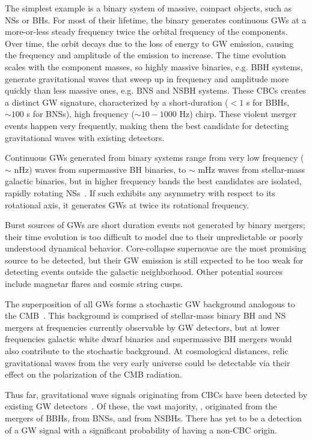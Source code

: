 The simplest example is a binary system of massive, compact objects, such as \acp{NS} or \acp{BH}.
For most of their lifetime, the binary generates continuous \acp{GW} at a more-or-less steady frequency twice the orbital frequency of the components.
Over time, the orbit decays due to the loss of energy to \ac{GW} emission, causing the frequency and amplitude of the emission to increase.
The time evolution scales with the component masses, so highly massive binaries, e.g. \ac{BBH} systems, generate gravitational waves that sweep up in frequency and amplitude more quickly than less massive ones, e.g. \ac{BNS} and \ac{NSBH}  systems.
These \acp{CBC} creates a distinct \ac{GW} signature, characterized by a short-duration ($<1$ s for \acp{BBH}, $\sim100$ s for \acp{BNS}), high frequency ($\sim10-1000$ Hz) chirp.
These violent merger events happen very frequently, making them the best candidate for detecting gravitational waves with existing detectors.

Continuous \acp{GW} generated from binary systems range from very low frequency ($\sim$ nHz) waves from supermassive \ac{BH} binaries, to $\sim$ mHz waves from stellar-mass galactic binaries, but in higher frequency bands the best candidates are isolated, rapidly rotating \acp{NS}~\citep{Riles_2017}.
If such  exhibits any asymmetry with respect to its rotational axis, it generates \acp{GW} at twice its rotational frequency.

Burst sources of \acp{GW} are short duration events not generated by binary mergers; their time evolution is too difficult to model due to their unpredictable or poorly understood dynamical behavior.
Core-collapse supernovae are the most promising source to be detected, but their \ac{GW} emission is still expected to be too weak for detecting events outside the galactic neighborhood.
Other potential sources include magnetar flares and cosmic string cusps.

The superposition of all \acp{GW} forms a stochastic \ac{GW} background analogous to the \ac{CMB}~\citep{Christensen_2018}.
This background is comprised of stellar-mass binary \ac{BH} and \ac{NS} mergers at frequencies currently observable by \ac{GW} detectors, but at lower frequencies galactic white dwarf binaries and supermassive BH mergers would also contribute to the stochastic background.
At cosmological distances, relic gravitational waves from the very early universe could be detectable via their effect on the polarization of the \ac{CMB} radiation.

Thus far, \XX gravitational wave signals originating from \acp{CBC} have been detected by existing \ac{GW} detectors~\citep{gwtc3}. Of these, the vast majority, \XX, originated from the mergers of \acp{BBH}, \XX from \acp{BNS}, and \XX from \acp{NSBH}. There has yet to be a detection of a \ac{GW} signal with a significant probability of having a non-\ac{CBC} origin.
